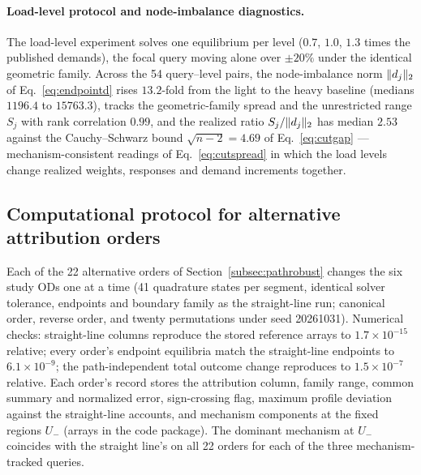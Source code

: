 \paragraph{Load-level protocol and node-imbalance diagnostics.}
The load-level experiment solves one equilibrium per level ($0.7$,
$1.0$, $1.3$ times the published demands), the focal query moving
alone over $\pm20\%$ under the identical geometric family. Across the
54 query--level pairs, the node-imbalance norm $\lVert d_j \rVert_2$ of
Eq.~\eqref{eq:endpointd} rises $13.2$-fold from the light to the
heavy baseline (medians $1196.4$ to $15763.3$), tracks the
geometric-family spread and the unrestricted range $S_j$ with rank
correlation $0.99$, and the realized ratio $S_j/\lVert d_j \rVert_2$ has
median $2.53$ against the Cauchy--Schwarz bound $\sqrt{n-2}=4.69$ of
Eq.~\eqref{eq:cutgap} --- mechanism-consistent readings of
Eq.~\eqref{eq:cutspread} in which the load levels change realized
weights, responses and demand increments together.

\subsection{Computational protocol for alternative attribution orders}\label{supp:pathrobust}
Each of the 22 alternative orders of Section~\ref{subsec:pathrobust}
changes the six study ODs one at a time (41 quadrature states per
segment, identical solver tolerance, endpoints and boundary family as
the straight-line run; canonical order, reverse order, and twenty
permutations under seed 20261031). Numerical checks: straight-line columns
reproduce the stored reference arrays to $1.7\times10^{-15}$ relative; every
order's endpoint equilibria match the straight-line endpoints to
$6.1\times10^{-9}$; the path-independent total outcome change
reproduces to $1.5\times10^{-7}$ relative. Each order's record stores
the attribution column, family range, common summary and normalized
error, sign-crossing flag, maximum profile deviation against the
straight-line accounts, and mechanism components at the fixed regions
$U_-$ (arrays in the code package). The dominant mechanism at $U_-$
coincides with the straight line's on all 22 orders for each of the
three mechanism-tracked queries.

